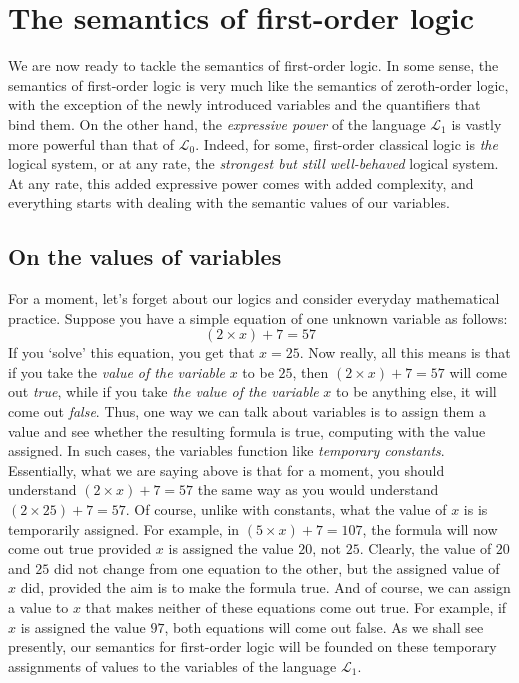 \chapter{The semantics of first-order logic}

We are now ready to tackle the semantics of first-order logic. In some sense, the semantics of first-order logic is very much like the semantics of zeroth-order logic, with the exception of the newly introduced variables and the quantifiers that bind them. On the other hand, the \textit{expressive power} of the language $\mathcal{L}_1$ is vastly more powerful than that of $\mathcal{L}_0$. Indeed, for some, first-order classical logic is \textit{the} logical system, or at any rate, the \textit{strongest but still well-behaved} logical system. At any rate, this added expressive power comes with added complexity, and everything starts with dealing with the semantic values of our variables. 

\section{On the values of variables}

For a moment, let's forget about our logics and consider everyday mathematical practice. Suppose you have a simple equation of one unknown variable as follows: 
\[
(2\times x)+7=57
\]
If you `solve' this equation, you get that $x=25$. Now really, all this means is that if you take the \textit{value of the variable} $x$ to be $25$, then $(2\times x)+7=57$ will come out \textit{true}, while if you take \textit{the value of the variable} $x$ to be anything else, it will come out \textit{false}. Thus, one way we can talk about variables is to assign them a value and see whether the resulting formula is true, computing with the value assigned. In such cases, the variables function like \textit{temporary constants}. Essentially, what we are saying above is that for a moment, you should understand $(2\times x)+7=57$ the same way as you would understand $(2 \times 25) + 7= 57$. Of course, unlike with constants, what the value of $x$ is is temporarily assigned. For example, in $(5 \times x)+7=107$, the formula will now come out true provided $x$ is assigned the value $20$, not $25$. Clearly, the value of $20$ and $25$ did not change from one equation to the other, but the assigned value of $x$ did, provided the aim is to make the formula true. And of course, we can assign a value to $x$ that makes neither of these equations come out true. For example, if $x$ is assigned the value $97$, both equations will come out false. As we shall see presently, our semantics for first-order logic will be founded on these temporary assignments of values to the variables of the language $\mathcal{L}_1$.

